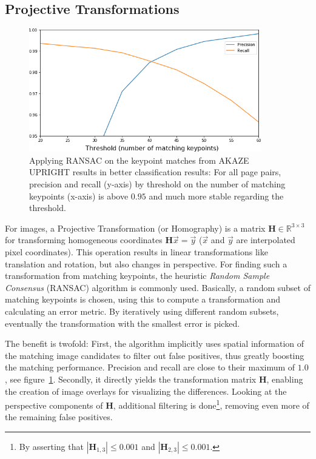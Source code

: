 \documentclass{ltjarticle}
\begin{document}
\subsection{Projective Transformations}

\begin{figure}
    \centering
    \includegraphics[width=0.9\textwidth]{ransacperformance}
    \caption[RANSAC performance]{Applying RANSAC on the keypoint matches from AKAZE UPRIGHT results in better classification results: For all page pairs, precision and recall (y-axis) by threshold on the number of matching keypoints (x-axis) is above $0.95$ and much more stable regarding the threshold.}
    \label{fig:ransac}
\end{figure}

For images, a Projective Transformation (or Homography) is a matrix $\mathbf{H} \in \mathbb{R}^{3 \times 3}$ for transforming homogeneous coordinates $\mathbf{H}\vec{x} = \vec{y}$ ($\vec{x}$ and $\vec{y}$ are interpolated pixel coordinates). This operation results in linear transformations like translation and rotation, but also changes in perspective.\cite{marschner2015fundamentals} For finding such a transformation from matching keypoints, the heuristic \emph{Random Sample Consensus} (RANSAC) algorithm is commonly used.\cite{fischler1981random} Basically, a random subset of matching keypoints is chosen, using this to compute a transformation and calculating an error metric. By iteratively using different random subsets, eventually the transformation with the smallest error is picked.

The benefit is twofold: First, the algorithm implicitly uses spatial information of the matching image candidates to filter out false positives, thus greatly boosting the matching performance. Precision and recall are close to their maximum of $1.0$, see figure~\ref{fig:ransac}. Secondly, it directly yields the transformation matrix $\mathbf{H}$, enabling the creation of image overlays for visualizing the differences. Looking at the perspective components of $\mathbf{H}$, additional filtering is done\footnote{By asserting that $|\mathbf{H}_{1,3}| \leq 0.001$ and $|\mathbf{H}_{2,3}| \leq 0.001$.}, removing even more of the remaining false positives.
\end{document}
